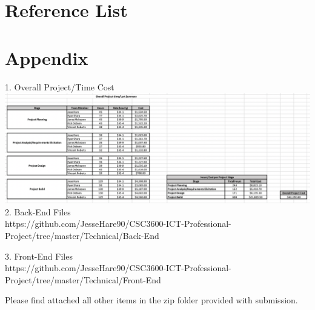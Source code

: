 \documentclass[11pt]{article}
\begin{document}
\section{Reference List}


\newpage


\section{Appendix}
1. Overall Project/Time Cost \\
\includegraphics[scale=0.35]{overall.png} \\

2. Back-End Files \\
https://github.com/JesseHare90/CSC3600-ICT-Professional-Project/tree/master/Technical/Back-End

3. Front-End Files \\
https://github.com/JesseHare90/CSC3600-ICT-Professional-Project/tree/master/Technical/Front-End

Please find attached all other items in the zip folder provided with submission.
\end{document}
